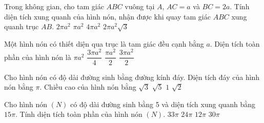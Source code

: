 \begin{ex}%
	Trong không gian, cho tam giác $ABC$ vuông tại $A$, $AC=a$ và $BC=2a$. Tính diện tích xung quanh của hình nón, nhận được khi quay tam giác $ABC$ xung quanh trục $AB$. 
	\choice
	{\True $2\pi a^2$}
	{$\pi a^2$}
	{$4\pi a^2$}
	{$2\pi a^2\sqrt{3}$}
\end{ex}
\begin{ex}%
	Một hình nón có thiết diện qua trục là tam giác đều cạnh bằng $a$. Diện tích toàn phần của hình nón là 
	\choice
	{$\pi a^2$}
	{\True $\dfrac{3\pi a^2}{4}$}
	{$\dfrac{\pi a^2}{2}$}
	{$\dfrac{3\pi a^2}{2}$}
\end{ex}
\begin{ex}%
	Cho hình nón có độ dài đường sinh bằng đường kính đáy. Diện tích đáy của hình nón bằng $\pi$. Chiều cao của hình nón bằng
	\choice
	{\True $\sqrt{3}$}
	{$\sqrt{5}$}
	{$1$}
	{$\sqrt{2}$}
\end{ex}
\begin{ex}%
	Cho hình nón $(N)$ có độ dài đường sinh bằng 5 và diện tích xung quanh bằng $15\pi$. Tính diện tích toàn phần của hình nón $(N)$. 
	\choice
	{$33\pi$}
	{\True $24\pi$}
	{$12\pi$}
	{$30\pi$}
\end{ex}
